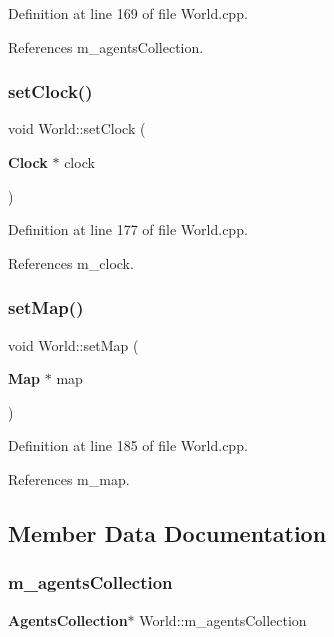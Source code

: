Definition at line 169 of file World.\+cpp.



References m\+\_\+agents\+Collection.

\mbox{\label{class_world_a52ebe3eed240fe4dd37915a1dad02efd}} 
\subsubsection{set\+Clock()}
{\footnotesize\ttfamily void World\+::set\+Clock (\begin{DoxyParamCaption}\item[{\textbf{ Clock} $\ast$}]{clock }\end{DoxyParamCaption})}



Definition at line 177 of file World.\+cpp.



References m\+\_\+clock.

\mbox{\label{class_world_a9dc80487d5c2d1d4f2af0c1d7f015204}} 
\subsubsection{set\+Map()}
{\footnotesize\ttfamily void World\+::set\+Map (\begin{DoxyParamCaption}\item[{\textbf{ Map} $\ast$}]{map }\end{DoxyParamCaption})}



Definition at line 185 of file World.\+cpp.



References m\+\_\+map.



\subsection{Member Data Documentation}
\mbox{\label{class_world_ae1262689381f00828c0a639b7cbb52a3}} 
\subsubsection{m\+\_\+agents\+Collection}
{\footnotesize\ttfamily \textbf{ Agents\+Collection}$\ast$ World\+::m\+\_\+agents\+Collection\hspace{0.3cm}{\ttfamily [private]}}



